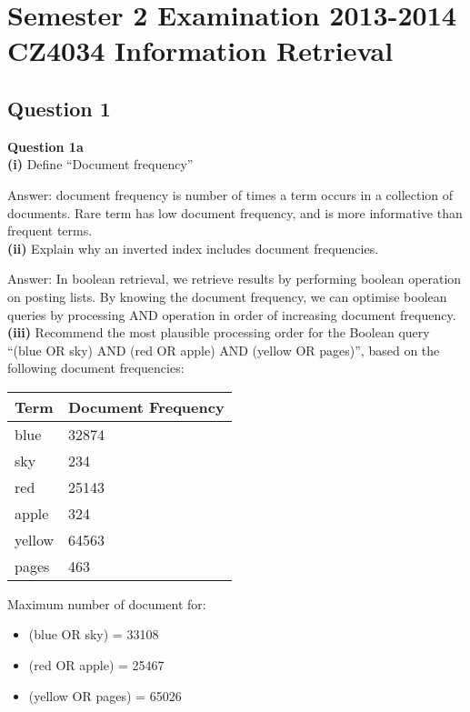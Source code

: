 \documentclass[11pt,a4paper]{report}
\begin{document}
\chapter{Semester 2 Examination 2013-2014\\CZ4034 Information Retrieval}

\begin{multicols*}{2}

\section{Question 1}

\noindent \textbf{Question 1a} \\

\noindent \textbf{(i)} Define ``Document frequency''

\noindent Answer: document frequency is number of times a term occurs in a collection of documents. Rare term has low document frequency, and is more informative than frequent terms.\\

\noindent \textbf{(ii)} Explain why an inverted index includes document frequencies.

\noindent Answer: In boolean retrieval, we retrieve results by performing boolean operation on posting lists. By knowing the document frequency, we can optimise boolean queries by processing AND operation in order of increasing document frequency.\\

\noindent \textbf{(iii)} Recommend the most plausible processing order for the Boolean query ``(blue OR sky) AND (red OR apple) AND (yellow OR pages)'', based on the following document frequencies:

\begin{center}
\begin{tabular}{ | l | l |} 
    \hline
    Term  & Document Frequency\\
    \hline
    blue  & 32874 \\
    sky   & 234 \\
    red   & 25143 \\
    apple & 324 \\
    yellow& 64563 \\
    pages & 463 \\
    \hline
\end{tabular}
\end{center}

\noindent Maximum number of document for:
\begin{itemize}
    \item (blue OR sky) = 33108
    \item (red OR apple) = 25467
    \item (yellow OR pages) = 65026
\end{itemize}


\end{multicols*}
\end{document}
